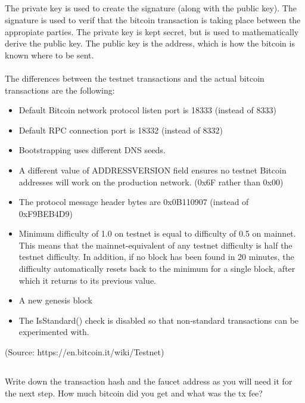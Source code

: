 \documentclass[letterpaper]{article}
\begin{document}
\subsection{}
The private key is used to create the signature (along with the public key). The signature is used to verif
 that the bitcoin transaction is taking place between the appropiate parties. The private key is kept secret, but is used to mathematically derive the public key. The public key is the address, which is how the bitcoin is known where to be sent.
\\
\\
The differences between the testnet transactions and the actual bitcoin transactions are the following:
\\
\begin{itemize}
    \item Default Bitcoin network protocol listen port is 18333 (instead of 8333)
    \item
Default RPC connection port is 18332 (instead of 8332)
\item
Bootstrapping uses different DNS seeds.
\item
A different value of ADDRESSVERSION field ensures no testnet Bitcoin addresses will work on the production network. (0x6F rather than 0x00)
\item
The protocol message header bytes are 0x0B110907 (instead of 0xF9BEB4D9)
\item
Minimum difficulty of 1.0 on testnet is equal to difficulty of 0.5 on mainnet. This means that the mainnet-equivalent of any testnet difficulty is half the testnet difficulty. In addition, if no block has been found in 20 minutes, the difficulty automatically resets back to the minimum for a single block, after which it returns to its previous value.
\item
A new genesis block
\item
The IsStandard() check is disabled so that non-standard transactions can be experimented with.
\end{itemize}
 (Source: https://en.bitcoin.it/wiki/Testnet)
\subsection{}
Write down the transaction hash and the faucet address as you will need it for the next step. How much bitcoin did you get and what was the tx fee?
\end{document}
